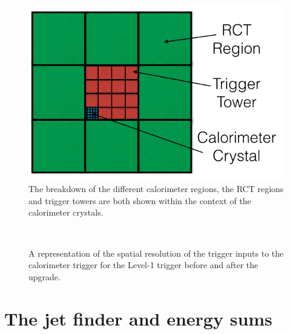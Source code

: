 \begin{figure}
	\begin{center}
		\includegraphics[width=0.5\linewidth]{figs/trigger/trigger_calorimeter}
	\end{center}
	\caption{The breakdown of the different calorimeter regions, the
  \ac{RCT} regions
  and trigger towers are both shown within the context of the \ECAL
  calorimeter crystals.}
	\label{fig:trigger_calorimeter}
\end{figure}

\begin{figure}
  \centering
  ~~
   \\
  \caption{A representation of the spatial resolution of the trigger
  inputs to the calorimeter trigger for the Level-1 trigger before and
  after the upgrade.}
  \label{fig:sunnyJim}
\end{figure}

\section{The jet finder and energy sums}
\label{sec:jetFinder}

